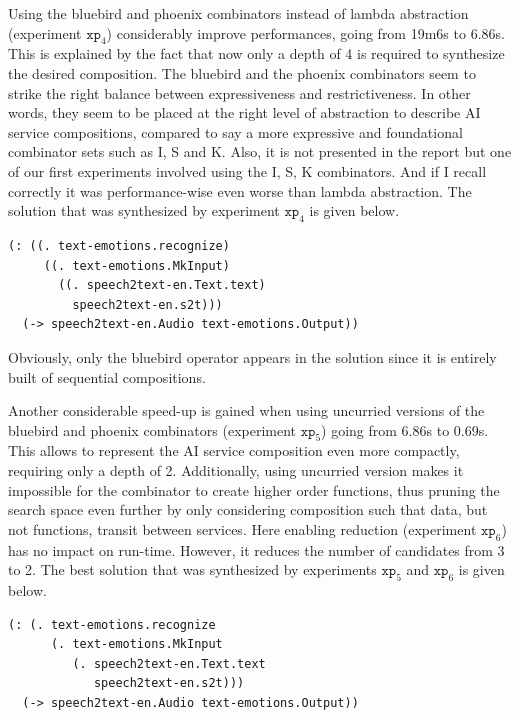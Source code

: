 \documentclass[]{report}
\begin{document}
Using the bluebird and phoenix combinators instead of lambda
abstraction (experiment $\texttt{xp}_4$) considerably improve
performances, going from 19m6s to 6.86s.  This is explained by the
fact that now only a depth of 4 is required to synthesize the desired
composition.  The bluebird and the phoenix combinators seem to strike
the right balance between expressiveness and restrictiveness.  In
other words, they seem to be placed at the right level of abstraction
to describe AI service compositions, compared to say a more expressive
and foundational combinator sets such as I, S and K.  Also, it is not
presented in the report but one of our first experiments involved
using the I, S, K combinators.  And if I recall correctly it was
performance-wise even worse than lambda abstraction.  The solution
that was synthesized by experiment $\texttt{xp}_4$ is given below.
\begin{verbatim}
(: ((. text-emotions.recognize)
     ((. text-emotions.MkInput)
       ((. speech2text-en.Text.text)
         speech2text-en.s2t)))
  (-> speech2text-en.Audio text-emotions.Output))
\end{verbatim}
Obviously, only the bluebird operator appears in the solution since it
is entirely built of sequential compositions.

Another considerable speed-up is gained when using uncurried versions
of the bluebird and phoenix combinators (experiment $\texttt{xp}_5$)
going from 6.86s to 0.69s.  This allows to represent the AI service
composition even more compactly, requiring only a depth of 2.
Additionally, using uncurried version makes it impossible for the
combinator to create higher order functions, thus pruning the search
space even further by only considering composition such that data, but
not functions, transit between services.  Here enabling reduction
(experiment $\texttt{xp}_6$) has no impact on run-time.  However, it
reduces the number of candidates from 3 to 2.  The best solution that
was synthesized by experiments $\texttt{xp}_5$ and $\texttt{xp}_6$ is
given below.
\begin{verbatim}
(: (. text-emotions.recognize
      (. text-emotions.MkInput
         (. speech2text-en.Text.text
            speech2text-en.s2t)))
  (-> speech2text-en.Audio text-emotions.Output))
\end{verbatim}
\end{document}
